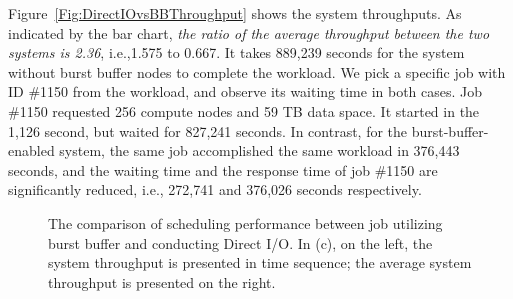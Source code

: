 Figure~\ref{Fig:DirectIOvsBBThroughput} shows the system throughputs.
As indicated by the bar chart, \textit{the ratio of the average throughput between the two systems is 2.36}, i.e.,1.575 to 0.667.
It takes 889,239 seconds for the system without burst buffer nodes to
complete the workload. We pick a specific job with ID \#1150 from the workload, and observe its
waiting time in both cases.
Job \#1150 requested 256 compute nodes and 59 TB data space.
It started in the 1,126 second, but waited for 827,241 seconds.
In contrast, for the burst-buffer-enabled system, the same job accomplished the same workload in 376,443 seconds, and the waiting time and the response time of job \#1150
are significantly reduced, i.e., 272,741 and 376,026 seconds respectively.


\begin{figure}[t]
        \centering
        \caption{The comparison of scheduling performance between job utilizing burst buffer and conducting Direct I/O. In (c), on the left, the system throughput is presented in time sequence; the average system throughput is presented on the right. }
        \label{Fig:DirectIOPerformance}
\end{figure}

